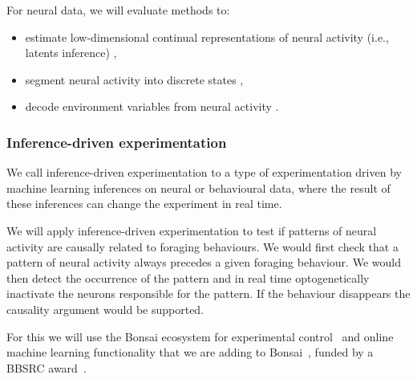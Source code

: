 For neural data, we will evaluate methods to:

\begin{itemize}

    \item estimate low-dimensional continual representations of
        neural activity (i.e., latents inference)
        \citep[e.g.,][]{mackeEtAl11,dunckerAndSahani18,walkerEtAl23,pandarinathEtAl18,saniEtAl21},

    \item segment neural activity into discrete states
        \citep[e.g.,][]{chenEtAl09,escolaEtAl11},

    \item decode environment variables from neural activity
        \citep[e.g.,][]{dengEtAl15,kloostermanEtAl14,tampuuEtAl19}.

\end{itemize}


\subsubsection{Inference-driven experimentation}

We call inference-driven experimentation to a type of experimentation driven by
machine learning inferences on neural or behavioural data, where the result of
these inferences can change the experiment in real time.

We will apply inference-driven experimentation to test if patterns of neural
activity are causally related to foraging behaviours.
%
We would first check that a pattern of neural activity always precedes a given
foraging behaviour. We would then detect the occurrence of the pattern and in
real time optogenetically inactivate the neurons responsible for the pattern.
%
If the behaviour disappears the causality argument would be supported.

For this we will use the Bonsai ecosystem for experimental
control~\citep{bonsai} and online machine learning functionality that we are
adding to Bonsai~\citep{bonsaiML}, funded by a BBSRC award~\citep{bbsrcAward}.

